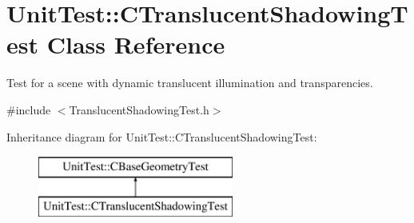 \hypertarget{class_unit_test_1_1_c_translucent_shadowing_test}{}\section{Unit\+Test\+::C\+Translucent\+Shadowing\+Test Class Reference}
\label{class_unit_test_1_1_c_translucent_shadowing_test}


Test for a scene with dynamic translucent illumination and transparencies.  




{\ttfamily \#include $<$Translucent\+Shadowing\+Test.\+h$>$}

Inheritance diagram for Unit\+Test\+::C\+Translucent\+Shadowing\+Test\+:\begin{figure}[H]
\begin{center}
\leavevmode
\includegraphics[height=2.000000cm]{class_unit_test_1_1_c_translucent_shadowing_test}
\end{center}
\end{figure}

